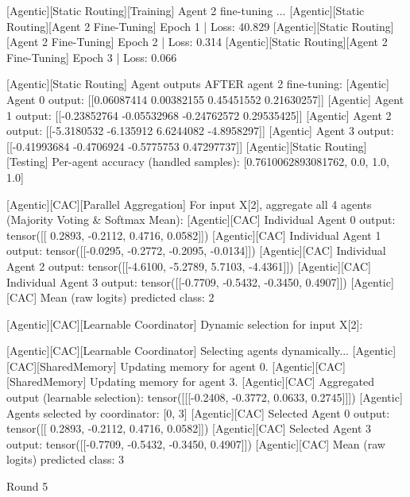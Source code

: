 [Agentic][Static Routing][Training] Agent 2 fine-tuning ...
[Agentic][Static Routing][Agent 2 Fine-Tuning] Epoch 1 | Loss: 40.829
[Agentic][Static Routing][Agent 2 Fine-Tuning] Epoch 2 | Loss: 0.314
[Agentic][Static Routing][Agent 2 Fine-Tuning] Epoch 3 | Loss: 0.066

[Agentic][Static Routing] Agent outputs AFTER agent 2 fine-tuning:
[Agentic] Agent 0 output: [[0.06087414 0.00382155 0.45451552 0.21630257]]
[Agentic] Agent 1 output: [[-0.23852764 -0.05532968 -0.24762572  0.29535425]]
[Agentic] Agent 2 output: [[-5.3180532 -6.135912   6.6244082 -4.8958297]]
[Agentic] Agent 3 output: [[-0.41993684 -0.4706924  -0.5775753   0.47297737]]
[Agentic][Static Routing][Testing] Per-agent accuracy (handled samples): [0.7610062893081762, 0.0, 1.0, 1.0]

[Agentic][CAC][Parallel Aggregation] For input X[2], aggregate all 4 agents (Majority Voting & Softmax Mean):
[Agentic][CAC] Individual Agent 0 output: tensor([[ 0.2893, -0.2112,  0.4716,  0.0582]])
[Agentic][CAC] Individual Agent 1 output: tensor([[-0.0295, -0.2772, -0.2095, -0.0134]])
[Agentic][CAC] Individual Agent 2 output: tensor([[-4.6100, -5.2789,  5.7103, -4.4361]])
[Agentic][CAC] Individual Agent 3 output: tensor([[-0.7709, -0.5432, -0.3450,  0.4907]])
[Agentic][CAC] Mean (raw logits) predicted class: 2

[Agentic][CAC][Learnable Coordinator] Dynamic selection for input X[2]:

[Agentic][CAC][Learnable Coordinator] Selecting agents dynamically...
[Agentic][CAC][SharedMemory] Updating memory for agent 0.
[Agentic][CAC][SharedMemory] Updating memory for agent 3.
[Agentic][CAC] Aggregated output (learnable selection): tensor([[[-0.2408, -0.3772,  0.0633,  0.2745]]])
[Agentic] Agents selected by coordinator: [0, 3]
[Agentic][CAC] Selected Agent 0 output: tensor([[ 0.2893, -0.2112,  0.4716,  0.0582]])
[Agentic][CAC] Selected Agent 3 output: tensor([[-0.7709, -0.5432, -0.3450,  0.4907]])
[Agentic][CAC] Mean (raw logits) predicted class: 3

Round 5

